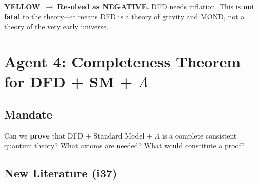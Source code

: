 \documentclass[11pt,a4paper]{article}
\newcommand{\YELLOW}{\textcolor{dfdyellow}{\textbf{YELLOW}}}
\begin{document}
\YELLOW\ $\to$ \textbf{Resolved as NEGATIVE.} DFD needs inflation. This is \textbf{not fatal} to the theory---it means DFD is a theory of gravity and MOND, not a theory of the very early universe.

\newpage
\section{Agent 4: Completeness Theorem for DFD + SM + $\Lambda$}
\label{sec:agent4}

\subsection{Mandate}

Can we \textbf{prove} that DFD + Standard Model + $\Lambda$ is a complete consistent quantum theory? What axioms are needed? What would constitute a proof?

\subsection{New Literature (i37)}
\end{document}

